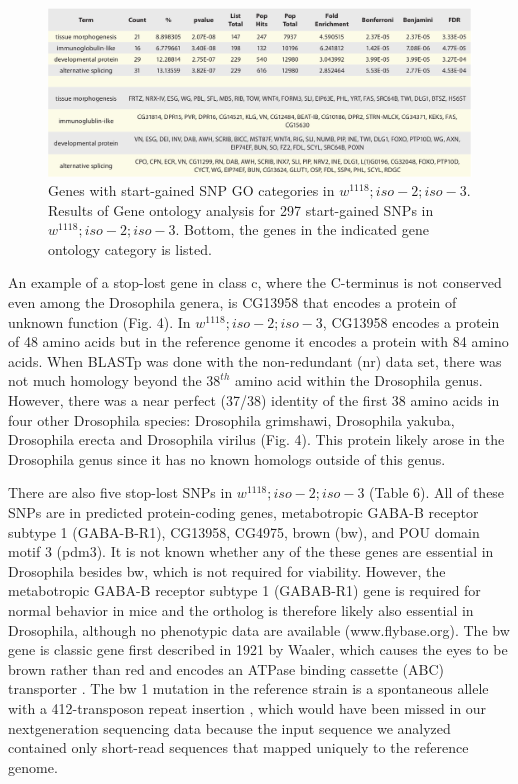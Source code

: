 \begin{figure}
    \centering
    \includegraphics[width=14cm]{snpeff_table6.png}
    \caption{Genes with start-gained SNP GO categories in $w^{1118} ; iso-2; iso-3$. Results of Gene ontology analysis for 297 start-gained SNPs in $w^{1118} ; iso-2; iso-3$. Bottom, the genes in the indicated gene ontology category is listed.}
    \label{fig:snpeffTab3}
\end{figure}

An example of a stop-lost gene in class c, where the C-terminus is not conserved even among the Drosophila genera, is CG13958 that encodes a protein of unknown function (Fig. 4). In $w^{1118} ; iso-2; iso-3$, CG13958 encodes a protein of 48 amino acids but in the reference genome it encodes a protein with 84 amino acids.  When BLASTp was done with the non-redundant (nr) data set, there was not much homology beyond the $38^{th}$ amino acid within the Drosophila genus. However, there was a near perfect (37/38) identity of the first 38 amino acids in four other Drosophila species: Drosophila grimshawi, Drosophila yakuba, Drosophila erecta and Drosophila virilus (Fig. 4). This protein likely arose in the Drosophila genus since it has no known homologs outside of this genus.

There are also five stop-lost SNPs in $w^{1118} ; iso-2; iso-3$ (Table 6). All of these SNPs are in predicted protein-coding genes, metabotropic GABA-B receptor subtype 1 (GABA-B-R1), CG13958, CG4975, brown (bw), and POU domain motif 3 (pdm3). It is not known whether any of the these genes are essential in Drosophila besides bw, which is not required for viability.  However, the metabotropic GABA-B receptor subtype 1 (GABAB-R1) gene is required for normal behavior in mice \cite{jones1998gabab} and the ortholog is therefore likely also essential in Drosophila, although no phenotypic data are available (www.flybase.org). The bw gene is classic gene first described in 1921 by Waaler, \cite{waaler1921location} which causes the eyes to be brown rather than red and encodes an ATPase binding cassette (ABC) transporter \cite{saurin1999getting}. The bw 1 mutation in the reference strain is a spontaneous allele with a 412-transposon repeat insertion \cite{dreesen1988brown}, which would have been missed in our nextgeneration sequencing data because the input sequence we analyzed contained only short-read sequences that mapped uniquely to the reference genome.

